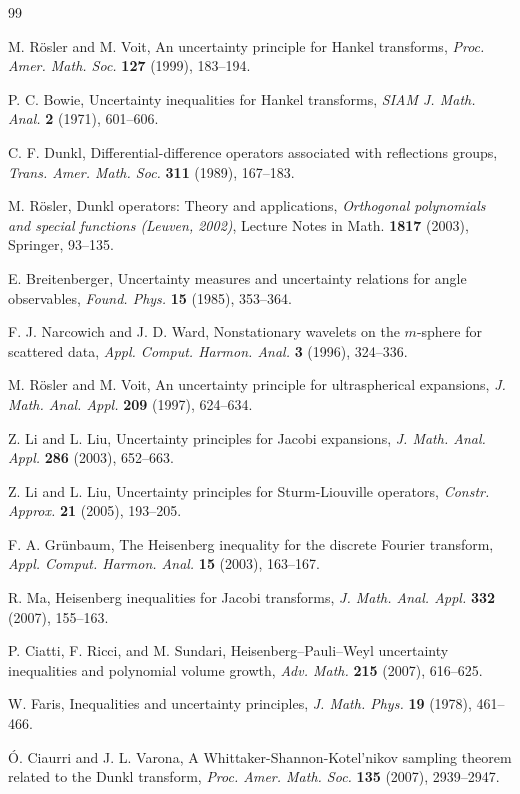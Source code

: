 \documentclass[a4paper]{amsart}
\theoremstyle{plain}
\theoremstyle{definition}
\begin{document}
\begin{thebibliography}{99}

 M. R\"osler and M. Voit,
{An uncertainty principle for Hankel transforms,}
\textit{Proc. Amer. Math. Soc.}
\textbf{127} (1999), 183--194.

 P. C. Bowie,
{Uncertainty inequalities for Hankel transforms,}
\textit{SIAM J. Math. Anal.}
\textbf{2} (1971), 601--606.

 C. F. Dunkl,
{Differential-difference operators associated with reflections groups,}
\textit{Trans. Amer. Math. Soc.}
\textbf{311} (1989), 167--183.

 M. R\"osler,
{Dunkl operators: Theory and applications,}  \textit{Orthogonal polynomials and special functions (Leuven, 2002)}, Lecture Notes in Math. \textbf{1817} (2003), Springer, 93--135.

 E. Breitenberger,
{Uncertainty measures and uncertainty relations for angle observables,}
\textit{Found. Phys.}
\textbf{15} (1985), 353--364.

 F. J. Narcowich and J. D. Ward,
{Nonstationary wavelets on the $m$-sphere for scattered data,}
\textit{Appl. Comput. Harmon. Anal.}
\textbf{3} (1996), 324--336.

 M. R\"osler and M. Voit,
{An uncertainty principle for ultraspherical expansions,}
\textit{J. Math. Anal. Appl.}
\textbf{209} (1997), 624--634.

 Z. Li and L. Liu,
{Uncertainty principles for Jacobi expansions,}
\textit{J. Math. Anal. Appl.}
\textbf{286} (2003), 652--663.

 Z. Li and L. Liu,
{Uncertainty principles for Sturm-Liouville operators,}
\textit{Constr. Approx.}
\textbf{21} (2005), 193--205.

 F. A. Gr\"unbaum,
{The Heisenberg inequality for the discrete Fourier transform,}
\textit{Appl. Comput. Harmon. Anal.}
\textbf{15} (2003), 163--167.

 R. Ma,
{Heisenberg inequalities for Jacobi transforms,}
\textit{J. Math. Anal. Appl.}
\textbf{332}  (2007), 155--163.

 P. Ciatti, F. Ricci, and M. Sundari,
{Heisenberg--Pauli--Weyl uncertainty inequalities and polynomial volume growth,}
\textit{Adv. Math.}
\textbf{215} (2007), 616--625.

 W. Faris,
{Inequalities and uncertainty principles,}
\textit{J. Math. Phys.}
\textbf{19} (1978), 461--466.

 \'O. Ciaurri and J. L. Varona,
{A Whittaker-Shannon-Kotel'nikov sampling theorem related to the Dunkl transform,}
\textit{Proc. Amer. Math. Soc.}
\textbf{135} (2007), 2939--2947.


\end{thebibliography}

\end{document}
